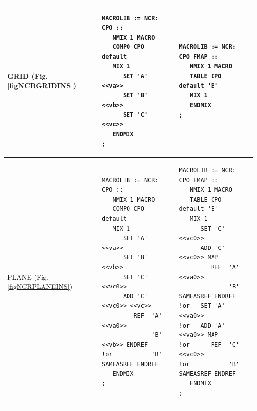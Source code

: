 \begin{center}
\tablelasttail{\hline}

\begin{supertabular}{|p{0.1\textwidth}|p{0.4\textwidth}|p{0.4\textwidth}|}
\hline
GRID (Fig. \ref{figNCRGRIDINS}) 
& \begin{verbatim}
MACROLIB := NCR: CPO ::
   NMIX 1 MACRO 
   COMPO CPO default
   MIX 1 
      SET 'A' <<va>>
      SET 'B' <<vb>>
      SET 'C' <<vc>>
   ENDMIX
;
\end{verbatim} 
& \begin{verbatim}
MACROLIB := NCR: CPO FMAP ::
   NMIX 1 MACRO 
   TABLE CPO default 'B' 
   MIX 1 
   ENDMIX
;
\end{verbatim} \\
\hline
PLANE (Fig. \ref{figNCRPLANEINS}) & 
\begin{verbatim}
MACROLIB := NCR: CPO ::
   NMIX 1 MACRO 
   COMPO CPO default
   MIX 1 
      SET 'A' <<va>>
      SET 'B' <<vb>>
      SET 'C' <<vc0>>
      ADD 'C' <<vc0>> <<vc>>
         REF  'A' <<va0>> 
              'B' <<vb>> ENDREF
!or           'B' SAMEASREF ENDREF
   ENDMIX
;
\end{verbatim} &
\begin{verbatim}
MACROLIB := NCR: CPO FMAP ::
   NMIX 1 MACRO 
   TABLE CPO default 'B' 
   MIX 1 
      SET 'C' <<vc0>>
      ADD 'C' <<vc0>> MAP
         REF  'A' <<va0>> 
              'B' SAMEASREF ENDREF
!or   SET 'A' <<va0>>
!or   ADD 'A' <<va0>> MAP
!or      REF  'C' <<vc0>> 
!or           'B' SAMEASREF ENDREF
   ENDMIX
;
\end{verbatim} \\
\hline
%

\end{supertabular}
\end{center}

